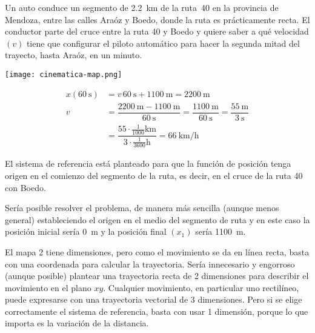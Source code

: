 \begin{mdframed}[style=ExampleFrame]
    \begin{example}
    \end{example}
    \begin{formatI}
        Un auto conduce un segmento de \SI{2,2}{\kilo\meter} de la ruta~40 en la provincia de Mendoza, entre las calles Araóz y Boedo, donde la ruta es prácticamente recta.
        El conductor parte del cruce entre la ruta 40 y Boedo y quiere saber a qué velocidad $(v)$ tiene que configurar el piloto automático para hacer la segunda mitad del trayecto, hasta Araóz, en un minuto.
    \end{formatI}
    
    \begin{center}
        \texttt{[image: cinematica-map.png]}
    \end{center}
    
    \begin{align*}
        x\left(\SI{60}{\second}\right) &= v \, \SI{60}{\second} + \SI{1100}{\metre} = \SI{2200}{\metre}
        \\[1ex]
        v &= \dfrac{\SI{2200}{\metre}-\SI{1100}{\metre}}{\SI{60}{\second}}
        = \dfrac{\SI{1100}{\metre}}{\SI{60}{\second}}
        = \dfrac{\SI{55}{\metre}}{\SI{3}{\second}}
        \\[1ex]
        &= \dfrac{55 \cdot \frac{1}{1000}\si{\kilo\meter}}{3 \cdot \frac{1}{3600}\si{\hour}}
        = \SI{66}{\kilo\metre/\hour}
    \end{align*}
    
    El sistema de referencia está planteado para que la función de posición tenga origen en el comienzo del segmento de la ruta, es decir, en el cruce de la ruta 40 con Boedo.
    
    \begin{center}
        \def\svgwidth{\linewidth}
        
    \end{center}
    
    Sería posible resolver el problema, de manera más sencilla (aunque menos general) estableciendo el origen en el medio del segmento de ruta y en este caso la posición inicial sería \SI{0}{\metre} y la posición final $(x_1)$ sería \SI{1100}{\metre}.
    
    El mapa 2 tiene dimensiones, pero como el movimiento se da en línea recta, basta con una coordenada para calcular la trayectoria.
    Sería innecesario y engorroso (aunque posible) plantear una trayectoria recta de 2 dimensiones para describir el movimiento en el plano $xy$.
    Cualquier movimiento, en particular uno rectilíneo, puede expresarse con una trayectoria vectorial de 3 dimensiones.
    Pero si se elige correctamente el sistema de referencia, basta con usar 1 dimensión, porque lo que importa es la variación de la distancia.
\end{mdframed}

